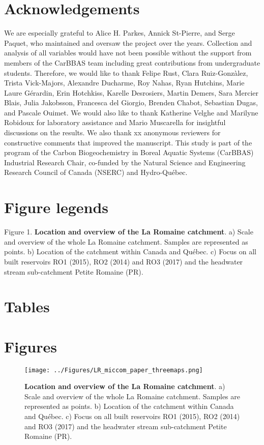 \documentclass[12pt,a4paper]{article} %
\begin{document}
\section*{Acknowledgements}
We are especially grateful to Alice H. Parkes, Annick St-Pierre, and Serge Paquet, who maintained and oversaw the project over the years. Collection and analysis of all variables would have not been possible without the support from members of the CarBBAS team including great contributions from undergraduate students. Therefore, we would like to thank Felipe Rust, Clara Ruiz-Gonz\`{a}lez, Trista Vick-Majors, Alexandre Ducharme, Roy Nahas, Ryan Hutchins, Marie Laure G\'{e}rardin,  Erin Hotchkiss, Karelle Desrosiers, Martin Demers, Sara Mercier Blais, Julia Jakobsson, Francesca del Giorgio, Brenden Chabot, Sebastian Dugas, and Pascale Ouimet. We would also like to thank Katherine Velghe and Marilyne Robidoux for laboratory assistance and Mario Muscarella for insightful discussions on the results. We also thank xx anonymous reviewers for constructive comments that improved the manuscript. This study is part of the program of the Carbon Biogeochemistry in Boreal Aquatic Systems (CarBBAS) Industrial Research Chair, co-funded by the Natural Science and Engineering Research Council of Canada (NSERC) and Hydro-Qu\'{e}bec.

\newpage
\singlespacing



\newpage
\section*{Figure legends}
Figure 1. \textbf{Location and overview of the La Romaine catchment}. a) Scale and overview of the whole La Romaine catchment. Samples are represented as points. b) Location of the catchment within Canada and Québec. c) Focus on all built reservoirs RO1 (2015), RO2 (2014) and RO3 (2017) and the headwater stream sub-catchment Petite Romaine (PR).

\section*{Tables}

\section*{Figures}
\begin{figure}[!ht]
\centering
\texttt{[image: ../Figures/LR\_miccom\_paper\_threemaps.png]}
\caption{\textbf{Location and overview of the La Romaine catchment}. a) Scale and overview of the whole La Romaine catchment. Samples are represented as points. b) Location of the catchment within Canada and Québec. c) Focus on all built reservoirs RO1 (2015), RO2 (2014) and RO3 (2017) and the headwater stream sub-catchment Petite Romaine (PR).}
\end{figure}
\end{document}
